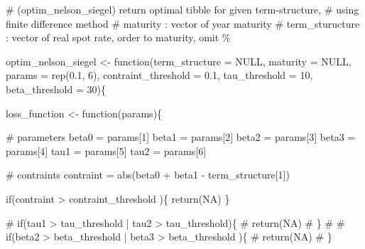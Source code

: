 \documentclass[
  a4paper,
  DIV=11,
  numbers=noendperiod]{scrreprt}
\newenvironment{Shaded}{\begin{snugshade}}{\end{snugshade}}
\newcommand{\AttributeTok}[1]{\textcolor[rgb]{0.40,0.45,0.13}{#1}}
\newcommand{\CommentTok}[1]{\textcolor[rgb]{0.37,0.37,0.37}{#1}}
\newcommand{\ConstantTok}[1]{\textcolor[rgb]{0.56,0.35,0.01}{#1}}
\newcommand{\ControlFlowTok}[1]{\textcolor[rgb]{0.00,0.23,0.31}{#1}}
\newcommand{\DecValTok}[1]{\textcolor[rgb]{0.68,0.00,0.00}{#1}}
\newcommand{\FloatTok}[1]{\textcolor[rgb]{0.68,0.00,0.00}{#1}}
\newcommand{\FunctionTok}[1]{\textcolor[rgb]{0.28,0.35,0.67}{#1}}
\newcommand{\NormalTok}[1]{\textcolor[rgb]{0.00,0.23,0.31}{#1}}
\newcommand{\OtherTok}[1]{\textcolor[rgb]{0.00,0.23,0.31}{#1}}
\newcommand{\SpecialCharTok}[1]{\textcolor[rgb]{0.37,0.37,0.37}{#1}}
\begin{document}
\begin{Shaded}
\begin{Highlighting}[]
\CommentTok{\# (optim\_nelson\_siegel) return optimal tibble for given term{-}structure,}
\CommentTok{\#                       using finite difference method}
\CommentTok{\# maturity : vector of year maturity}
\CommentTok{\# term\_sturucture : vector of real spot rate, order to maturity, omit \%}

\NormalTok{optim\_nelson\_siegel }\OtherTok{\textless{}{-}} \ControlFlowTok{function}\NormalTok{(}\AttributeTok{term\_structure =} \ConstantTok{NULL}\NormalTok{, }\AttributeTok{maturity =} \ConstantTok{NULL}\NormalTok{, }\AttributeTok{params =} \FunctionTok{rep}\NormalTok{(}\FloatTok{0.1}\NormalTok{, }\DecValTok{6}\NormalTok{),}
                                \AttributeTok{contraint\_threshold =} \FloatTok{0.1}\NormalTok{, }\AttributeTok{tau\_threshold =} \DecValTok{10}\NormalTok{, }\AttributeTok{beta\_threshold =} \DecValTok{30}\NormalTok{)\{}
  
\NormalTok{  loss\_function }\OtherTok{\textless{}{-}} \ControlFlowTok{function}\NormalTok{(params)\{}
    
    \CommentTok{\# parameters }
\NormalTok{    beta0 }\OtherTok{=}\NormalTok{ params[}\DecValTok{1}\NormalTok{]}
\NormalTok{    beta1 }\OtherTok{=}\NormalTok{ params[}\DecValTok{2}\NormalTok{]}
\NormalTok{    beta2 }\OtherTok{=}\NormalTok{ params[}\DecValTok{3}\NormalTok{]}
\NormalTok{    beta3 }\OtherTok{=}\NormalTok{ params[}\DecValTok{4}\NormalTok{]}
\NormalTok{    tau1  }\OtherTok{=}\NormalTok{ params[}\DecValTok{5}\NormalTok{]}
\NormalTok{    tau2  }\OtherTok{=}\NormalTok{ params[}\DecValTok{6}\NormalTok{]}
    
    \CommentTok{\# contraints}
\NormalTok{    contraint }\OtherTok{=} \FunctionTok{abs}\NormalTok{(beta0 }\SpecialCharTok{+}\NormalTok{ beta1 }\SpecialCharTok{{-}}\NormalTok{ term\_structure[}\DecValTok{1}\NormalTok{])}
    
    \ControlFlowTok{if}\NormalTok{(contraint }\SpecialCharTok{\textgreater{}}\NormalTok{ contraint\_threshold )\{}
      \FunctionTok{return}\NormalTok{(}\ConstantTok{NA}\NormalTok{)}
\NormalTok{    \}}
    
    \CommentTok{\# if(tau1 \textgreater{} tau\_threshold | tau2 \textgreater{} tau\_threshold)\{}
    \CommentTok{\#   return(NA)}
    \CommentTok{\# \}}
    \CommentTok{\# }
    \CommentTok{\# if(beta2 \textgreater{} beta\_threshold | beta3 \textgreater{} beta\_threshold )\{}
    \CommentTok{\#   return(NA)}
    \CommentTok{\# \}}
    

\end{Highlighting}
\end{Shaded}
\end{document}
